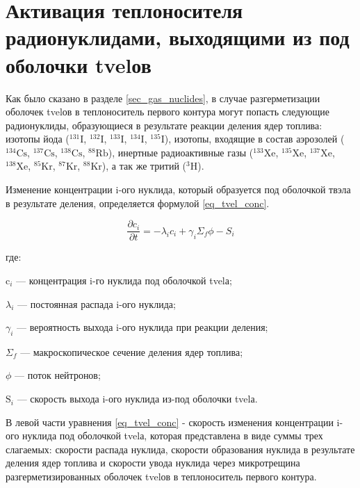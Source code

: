 \section{Активация теплоносителя радионуклидами, выходящими из под оболочки \ac{tvel}ов}
\label{sec_tvel_nuclides}

Как было сказано в разделе \ref{sec_gas_nuclides}, в случае разгерметизации оболочек \ac{tvel}ов в теплоноситель 
первого контура могут попасть следующие радионуклиды, образующиеся в результате реакции деления ядер топлива: изотопы 
йода ($^{131}\text{I}$, $^{132}\text{I}$, $^{133}\text{I}$, $^{134}\text{I}$, $^{135}\text{I}$), изотопы, входящие в 
состав аэрозолей ($^{134}\text{Cs}$, $^{137}\text{Cs}$, $^{138}\text{Cs}$, $^{88}\text{Rb}$), инертные радиоактивные 
газы ($^{133}\text{Xe}$, $^{135}\text{Xe}$, $^{137}\text{Xe}$, $^{138}\text{Xe}$, $^{85}\text{Kr}$, $^{87}\text{Kr}$, 
$^{88}\text{Kr}$), а так же тритий ($^{3}\text{H}$).

Изменение концентрации i-ого нуклида, который образуется под оболочкой твэла в результате деления, определяется формулой 
\ref{eq_tvel_conc}.

\begin{equation}
    \label{eq_tvel_conc}
    \frac{\partial c_{i}}{\partial t} = -\lambda_{i}c_{i} + \gamma_{i}\Sigma_{f}\phi - S_{i}
\end{equation}

где:
\begin{description}
    \item $\text{c}_i$ --- концентрация i-го нуклида под оболочкой \ac{tvel}а;
    \item $\lambda_{i}$ ---  постоянная распада i-ого нуклида;
    \item $\gamma_{i}$ --- вероятность выхода i-ого нуклида при реакции деления;
    \item $\Sigma_{f}$ --- макроскопическое сечение деления ядер топлива;
    \item $\phi$ --- поток нейтронов;
    \item $\text{S}_{i}$ --- скорость выхода i-ого нуклида из-под оболочки \ac{tvel}а.
\end{description}

В левой части уравнения \ref{eq_tvel_conc} - скорость изменения концентрации i-ого нуклида под оболочкой \ac{tvel}а, 
которая представлена в виде суммы трех слагаемых: скорости распада нуклида, скорости образования нуклида в результате 
деления ядер топлива и скорости увода нуклида через микротрещина разгерметизированных оболочек \ac{tvel}ов в 
теплоноситель первого контура.

